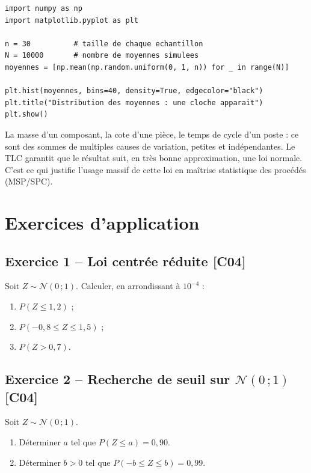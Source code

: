 \documentclass[a4paper,11pt]{article}
\begin{document}
\begin{lstlisting}[style=uimmpython, caption={Illustration du TLC : moyennes de tirages uniformes}]
import numpy as np
import matplotlib.pyplot as plt

n = 30          # taille de chaque echantillon
N = 10000       # nombre de moyennes simulees
moyennes = [np.mean(np.random.uniform(0, 1, n)) for _ in range(N)]

plt.hist(moyennes, bins=40, density=True, edgecolor="black")
plt.title("Distribution des moyennes : une cloche apparait")
plt.show()
\end{lstlisting}

\begin{appliindus}
La masse d'un composant, la cote d'une pièce, le temps de cycle d'un poste : ce sont des sommes de multiples causes de variation, petites et indépendantes. Le TLC garantit que le résultat suit, en très bonne approximation, une loi normale. C'est ce qui justifie l'usage massif de cette loi en maîtrise statistique des procédés (MSP/SPC).
\end{appliindus}

\newpage
\section{Exercices d'application}

\subsection*{Exercice 1 -- Loi centrée réduite \hfill {\normalsize\color{uimmred}[C04]}}
Soit $Z \sim \mathcal{N}(0\,;1)$. Calculer, en arrondissant à $10^{-4}$ :
\begin{enumerate}[label=\alph*)]
  \item $P(Z \leq 1{,}2)$ ;
  \item $P(-0{,}8 \leq Z \leq 1{,}5)$ ;
  \item $P(Z > 0{,}7)$.
\end{enumerate}

\subsection*{Exercice 2 -- Recherche de seuil sur $\mathcal{N}(0\,;1)$ \hfill {\normalsize\color{uimmred}[C04]}}
Soit $Z \sim \mathcal{N}(0\,;1)$.
\begin{enumerate}[label=\alph*)]
  \item Déterminer $a$ tel que $P(Z \leq a) = 0{,}90$.
  \item Déterminer $b > 0$ tel que $P(-b \leq Z \leq b) = 0{,}99$.
\end{enumerate}
\end{document}
